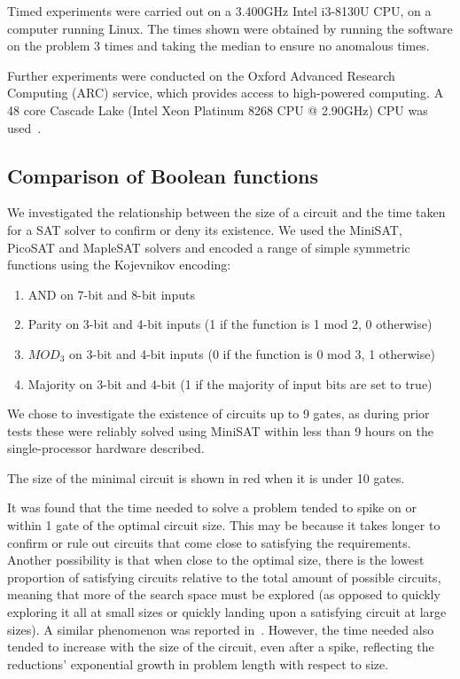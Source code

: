 \documentclass{article}
\begin{document}
Timed experiments were carried out on a 3.400GHz Intel i3-8130U CPU, on a computer running Linux. The times shown were obtained by running the software on the problem 3 times and taking the median to ensure no anomalous times.

Further experiments were conducted on the Oxford Advanced Research Computing (ARC) service, which provides access to high-powered computing. A 48 core Cascade Lake (Intel Xeon Platinum 8268 CPU @ 2.90GHz) CPU was used~\cite{arc}.

\subsection{Comparison of Boolean functions}\label{funcresults}

We investigated the relationship between the size of a circuit and the time taken for a SAT solver to confirm or deny its existence. We used the MiniSAT, PicoSAT and MapleSAT solvers and encoded a range of simple symmetric functions using the Kojevnikov encoding:

\begin{enumerate}
  \item AND on 7-bit and 8-bit inputs
  \item Parity on 3-bit and 4-bit inputs (1 if the function is 1 mod 2, 0 otherwise)
  \item \(MOD_3\) on 3-bit and 4-bit inputs (0 if the function is 0 mod 3, 1 otherwise)
  \item Majority on 3-bit and 4-bit  (1 if the majority of input bits are set to true)
\end{enumerate}

We chose to investigate the existence of circuits up to 9 gates, as during prior tests these were reliably solved using MiniSAT within less than 9 hours on the single-processor hardware described.

The size of the minimal circuit is shown in red when it is under 10 gates. 

It was found that the time needed to solve a problem tended to spike on or within 1 gate of the optimal circuit size. This may be because it takes longer to confirm or rule out circuits that come close to satisfying the requirements. Another possibility is that when close to the optimal size, there is the lowest proportion of satisfying circuits relative to the total amount of possible circuits, meaning that more of the search space must be explored (as opposed to quickly exploring it all at small sizes or quickly landing upon a satisfying circuit at large sizes). A similar phenomenon was reported in~\cite{estrada}. However, the time needed also tended to increase with the size of the circuit, even after a spike, reflecting the reductions' exponential growth in problem length with respect to size.
\end{document}
